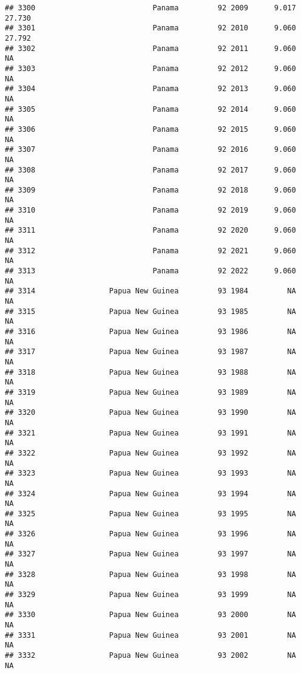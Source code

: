 \documentclass[
]{article}
\begin{document}
\begin{verbatim}
## 3300                           Panama         92 2009      9.017     27.730
## 3301                           Panama         92 2010      9.060     27.792
## 3302                           Panama         92 2011      9.060         NA
## 3303                           Panama         92 2012      9.060         NA
## 3304                           Panama         92 2013      9.060         NA
## 3305                           Panama         92 2014      9.060         NA
## 3306                           Panama         92 2015      9.060         NA
## 3307                           Panama         92 2016      9.060         NA
## 3308                           Panama         92 2017      9.060         NA
## 3309                           Panama         92 2018      9.060         NA
## 3310                           Panama         92 2019      9.060         NA
## 3311                           Panama         92 2020      9.060         NA
## 3312                           Panama         92 2021      9.060         NA
## 3313                           Panama         92 2022      9.060         NA
## 3314                 Papua New Guinea         93 1984         NA         NA
## 3315                 Papua New Guinea         93 1985         NA         NA
## 3316                 Papua New Guinea         93 1986         NA         NA
## 3317                 Papua New Guinea         93 1987         NA         NA
## 3318                 Papua New Guinea         93 1988         NA         NA
## 3319                 Papua New Guinea         93 1989         NA         NA
## 3320                 Papua New Guinea         93 1990         NA         NA
## 3321                 Papua New Guinea         93 1991         NA         NA
## 3322                 Papua New Guinea         93 1992         NA         NA
## 3323                 Papua New Guinea         93 1993         NA         NA
## 3324                 Papua New Guinea         93 1994         NA         NA
## 3325                 Papua New Guinea         93 1995         NA         NA
## 3326                 Papua New Guinea         93 1996         NA         NA
## 3327                 Papua New Guinea         93 1997         NA         NA
## 3328                 Papua New Guinea         93 1998         NA         NA
## 3329                 Papua New Guinea         93 1999         NA         NA
## 3330                 Papua New Guinea         93 2000         NA         NA
## 3331                 Papua New Guinea         93 2001         NA         NA
## 3332                 Papua New Guinea         93 2002         NA         NA

\end{verbatim}
\end{document}
